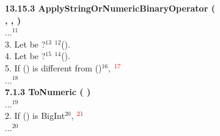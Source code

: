 \begin{figure}
\begin{subfigure}{\textwidth}
    \textbf{13.15.3 ApplyStringOrNumericBinaryOperator (
      ,
      ,
    )}
    \vspace*{.5em}\\%
    ...${}^{11}$
    \\%
    3. Let  be ?${}^{13}$ ${}^{12}$().
    \\%
    4. Let  be ?${}^{15}$ ${}^{14}$().
    \\%
    5. If () is different from ()${}^{16}$,
    ${}^{{\color{red}{17}}}$
    \\%
    ...${}^{18}$
    \\%

    \textbf{7.1.3 ToNumeric (  )}
    \vspace*{.5em}\\%
    ...${}^{19}$
    \\%
    2. If () is BigInt${}^{20}$, ${}^{\color{red}{21}}$
    \\%
    ...${}^{20}$
    \\%


\end{subfigure}
\end{figure}
